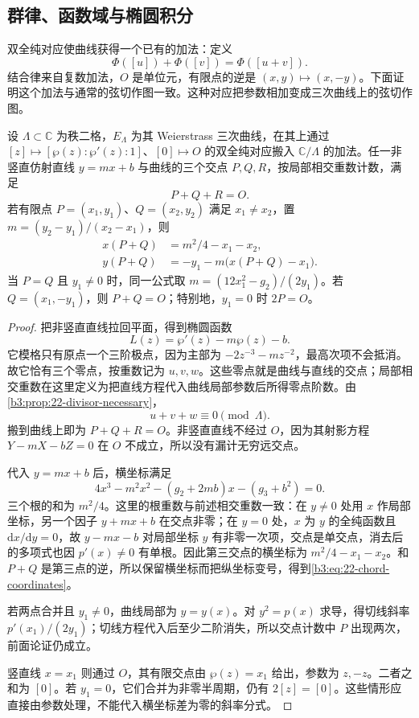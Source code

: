 \subsection{群律、函数域与椭圆积分}
\label{b3:subsec:220405}

双全纯对应使曲线获得一个已有的加法：定义
\[
 \Phi([u])+\Phi([v])=\Phi([u+v]).
\]
结合律来自复数加法，\(O\) 是单位元，有限点的逆是 \((x,y)\mapsto(x,-y)\)。下面证明这个加法与通常的弦切作图一致。这种对应把参数相加变成三次曲线上的弦切作图。

\begin{proposition}[弦切规则]\label{b3:prop:22-chord-tangent}
设 \(\Lambda\subset\mathbb C\) 为秩二格，\(E_\Lambda\) 为其 Weierstrass 三次曲线，在其上通过 \([z]\mapsto[\wp(z):\wp'(z):1]\)、\([0]\mapsto O\) 的双全纯对应搬入 \(\mathbb C/\Lambda\) 的加法。任一非竖直仿射直线 \(y=mx+b\) 与曲线的三个交点 \(P,Q,R\)，按局部相交重数计数，满足
\[
 P+Q+R=O.
\]
若有限点 \(P=(x_1,y_1)\)、\(Q=(x_2,y_2)\) 满足 \(x_1\ne x_2\)，置 \(m=(y_2-y_1)/(x_2-x_1)\)，则
\begin{equation}\label{b3:eq:22-chord-coordinates}
 \begin{aligned}
 x(P+Q)&=m^2/4-x_1-x_2,\\
 y(P+Q)&=-y_1-m\bigl(x(P+Q)-x_1\bigr).
 \end{aligned}
\end{equation}
当 \(P=Q\) 且 \(y_1\ne0\) 时，同一公式取
\(m=(12x_1^2-g_2)/(2y_1)\)。若 \(Q=(x_1,-y_1)\)，则 \(P+Q=O\)；特别地，\(y_1=0\) 时 \(2P=O\)。
\end{proposition}
\begin{proof}
把非竖直直线拉回平面，得到椭圆函数
\[
 L(z)=\wp'(z)-m\wp(z)-b.
\]
它模格只有原点一个三阶极点，因为主部为 \(-2z^{-3}-mz^{-2}\)，最高次项不会抵消。故它恰有三个零点，按重数记为 \(u,v,w\)。这些零点就是曲线与直线的交点；局部相交重数在这里定义为把直线方程代入曲线局部参数后所得零点阶数。由\cref{b3:prop:22-divisor-necessary}，
\[
 u+v+w\equiv0\pmod\Lambda.
\]
搬到曲线上即为 \(P+Q+R=O\)。非竖直直线不经过 \(O\)，因为其射影方程 \(Y-mX-bZ=0\) 在 \(O\) 不成立，所以没有漏计无穷远交点。

代入 \(y=mx+b\) 后，横坐标满足
\[
 4x^3-m^2x^2-(g_2+2mb)x-(g_3+b^2)=0.
\]
三个根的和为 \(m^2/4\)。这里的根重数与前述相交重数一致：在 \(y\ne0\) 处用 \(x\) 作局部坐标，另一个因子 \(y+mx+b\) 在交点非零；在 \(y=0\) 处，\(x\) 为 \(y\) 的全纯函数且 \(\mathrm dx/\mathrm dy=0\)，故 \(y-mx-b\) 对局部坐标 \(y\) 有非零一次项，交点是单交点，消去后的多项式也因 \(p'(x)\ne0\) 有单根。因此第三交点的横坐标为 \(m^2/4-x_1-x_2\)。和 \(P+Q\) 是第三点的逆，所以保留横坐标而把纵坐标变号，得到\eqref{b3:eq:22-chord-coordinates}。

若两点合并且 \(y_1\ne0\)，曲线局部为 \(y=y(x)\)。对 \(y^2=p(x)\) 求导，得切线斜率 \(p'(x_1)/(2y_1)\)；切线方程代入后至少二阶消失，所以交点计数中 \(P\) 出现两次，前面论证仍成立。

竖直线 \(x=x_1\) 则通过 \(O\)，其有限交点由 \(\wp(z)=x_1\) 给出，参数为 \(z,-z\)。二者之和为 \([0]\)。若 \(y_1=0\)，它们合并为非零半周期，仍有 \(2[z]=[0]\)。这些情形应直接由参数处理，不能代入横坐标差为零的斜率分式。
\end{proof}

